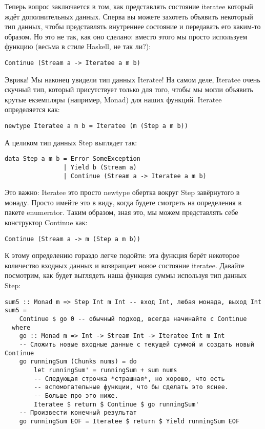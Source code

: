 Теперь вопрос заключается в том, как представлять состояние iteratee который ждёт дополнительных данных. Сперва вы можете захотеть объявить некоторый тип данных, чтобы представлять внутреннее состояние и передавать его каким-то образом. Но это не так, как оно сделано: вместо этого мы просто используем функцию (весьма в стиле Haskell, не так ли?):

\begin{lstlisting}
Continue (Stream a -> Iteratee a m b)
\end{lstlisting}

Эврика! Мы наконец увидели тип данных Iteratee! На самом деле, Iteratee очень скучный тип, который присутствует только для того, чтобы мы могли объявить крутые екземпляры (например, Monad) для наших функций. Iteratee определяется как:

\begin{lstlisting}
newtype Iteratee a m b = Iteratee (m (Step a m b))
\end{lstlisting}

А целиком тип данных Step выглядет так:

\begin{lstlisting}
data Step a m b = Error SomeException 
                | Yield b (Stream a) 
                | Continue (Stream a -> Iteratee a m b)
\end{lstlisting}

Это важно: Iteratee это просто newtype обертка вокруг Step завёрнутого в монаду. Просто имейте это в виду, когда будете смотреть на определения в пакете enumerator. Таким образом, зная это, мы можем представлять себе конструктор Continue как:

\begin{lstlisting}
Continue (Stream a -> m (Step a m b))
\end{lstlisting}

К этому определению гораздо легче подойти: эта функция берёт некоторое количество входных данных и возвращает новое состояние iteratee. Давайте посмотрим, как будет выглядеть наша функция суммы используя тип данных Step:

\begin{lstlisting}
sum5 :: Monad m => Step Int m Int -- вход Int, любая монада, выход Int
sum5 =
    Continue $ go 0 -- обычный подход, всегда начинайте с Continue
  where
    go :: Monad m => Int -> Stream Int -> Iteratee Int m Int
    -- Сложить новые входные данные с текущей суммой и создать новый Continue
    go runningSum (Chunks nums) = do
        let runningSum' = runningSum + sum nums
        -- Следующая строчка *страшная*, но хорошо, что есть 
        -- вспомогательные функции, что бы сделать это яснее.
        -- Больше про это ниже.
        Iteratee $ return $ Continue $ go runningSum'
    -- Произвести конечный результат
    go runningSum EOF = Iteratee $ return $ Yield runningSum EOF
\end{lstlisting}

